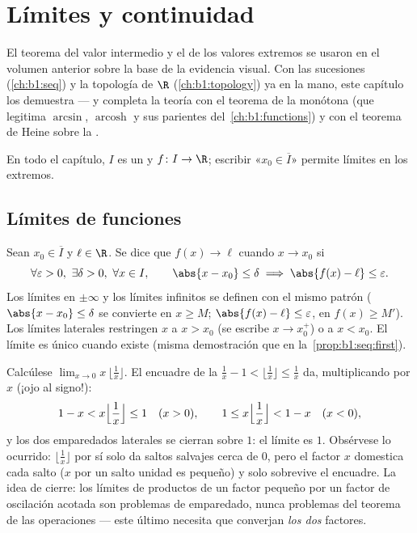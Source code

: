 \chapter{Límites y continuidad}\label{ch:b1:continuity}

El teorema del valor intermedio y el de los valores extremos se
usaron en el volumen anterior sobre la base de la evidencia visual.
Con las sucesiones (\cref{ch:b1:seq}) y la topología de $\R$
(\cref{ch:b1:topology}) ya en la mano, este capítulo los demuestra ---
y completa la teoría con el teorema de la  monótona (que
legitima $\arcsin$, $\operatorname{arcosh}$ y sus parientes
del~\cref{ch:b1:functions}) y con el teorema de Heine sobre la
.

En todo el capítulo, $I$ es un  y $f \colon I \to \R$; escribir
«$x_0 \in \overline I$» permite límites en los extremos.

\section{Límites de funciones}

\begin{definition}\label{def:b1:continuity:limit}
Sean $x_0 \in \overline{I}$ y $\ell \in \R$. Se dice que
$f(x) \to \ell$ cuando $x \to x_0$ si
\[
\forall \varepsilon > 0,\ \exists \delta > 0,\ \forall x \in I,
\qquad \abs{x - x_0} \leq \delta \implies \abs{f(x) - \ell} \leq
\varepsilon .
\]
Los límites en $\pm\infty$ y los límites infinitos se definen con el
mismo patrón ($\abs{x - x_0} \leq \delta$ se convierte en $x \geq M$;
$\abs{f(x) - \ell} \leq \varepsilon$, en $f(x) \geq M'$). Los límites
laterales restringen $x$ a $x > x_0$ (se escribe $x \to x_0^+$) o a
$x < x_0$. El límite es único cuando existe (misma demostración que
en la~\cref{prop:b1:seq:first}).
\end{definition}

\begin{example}\label{ex:b1:continuity:floorlimit}
Calcúlese $\lim_{x \to 0} x\,\bigl\lfloor \frac1x \bigr\rfloor$. El
encuadre de la  $\frac1x - 1 < \lfloor \frac1x \rfloor
\leq \frac1x$ da, multiplicando por $x$ (¡ojo al signo!):
\[
1 - x < x\Bigl\lfloor \frac1x \Bigr\rfloor \leq 1 \quad (x > 0),
\qquad
1 \leq x\Bigl\lfloor \frac1x \Bigr\rfloor < 1 - x \quad (x < 0),
\]
y los dos emparedados laterales se cierran sobre $1$: el límite es
$1$. Obsérvese lo ocurrido: $\lfloor \frac1x\rfloor$ por sí solo da
saltos salvajes cerca de $0$, pero el factor $x$ domestica cada salto
($x$ por un salto unidad es pequeño) y solo sobrevive el encuadre. La
idea de cierre: los límites de productos de un factor pequeño por un
factor de oscilación acotada son problemas de emparedado, nunca
problemas del teorema de las operaciones --- este último necesita que
converjan \emph{los dos} factores.
\end{example}

